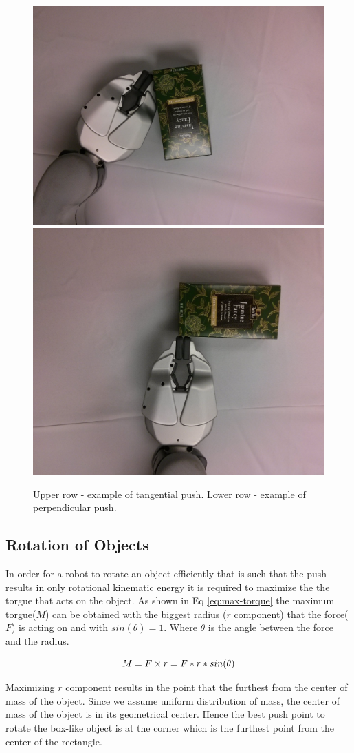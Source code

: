 \begin{figure}

\includegraphics[width=0.4\columnwidth]{figures/peets-tangential.jpg}\\
\includegraphics[width=0.4\columnwidth]{figures/peets-perpendicular.jpg}\\


\caption{Upper row - example of tangential push. Lower row - example of perpendicular push.}
\label{fig:tangential-example}
\end{figure}


\subsection{Rotation of Objects}
In order for a robot to rotate an object efficiently that is such that the push results in only rotational kinematic energy it is required to maximize the the torgue that acts on the object. As shown in Eq \ref{eq:max-torque} the maximum torgue($M$) can be obtained with the biggest radius ($r$ component) that the force($F$) is acting on and with $sin(\theta) = 1$. Where $\theta$ is the angle between the force and the radius.

\begin{equation}
M =  F \times r = F*r*sin(\theta)\\
\label{eq:max-torque}
\end{equation}

Maximizing $r$ component results in the point that the furthest from the center of mass of the object. Since we assume uniform distribution of mass, the center of mass of the object is in its geometrical center. Hence the best push point to rotate the box-like object is at the corner which is the furthest point from the center of the rectangle.


